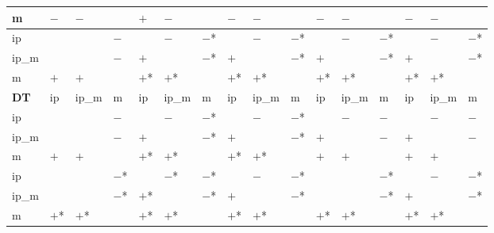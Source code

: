 \begin{table}[htbp]
{\begin{tabular}{l|lll|lll|lll|lll|lll}
m            & $-$        & $-$        &            & $+$        & $-$        &            & $-$        & $-$        &            & $-$        & $-$        &            & $-$        & $-$        &             \\
\hline
\hline
ip           &            &            & $-$        &            & $-$        & $-$*       &            & $-$        & $-$*       &            & $-$        & $-$*       &            & $-$        & $-$*        \\
ip\_m        &            &            & $-$        & $+$        &            & $-$*       & $+$        &            & $-$*       & $+$        &            & $-$*       & $+$        &            & $-$*        \\
m            & $+$        & $+$        &            & $+$*       & $+$*       &            & $+$*       & $+$*       &            & $+$*       & $+$*       &            & $+$*       & $+$*       &             \\
\hline
\textbf{DT}  & ip         & ip\_m      & m          & ip         & ip\_m      & m          & ip         & ip\_m      & m          & ip         & ip\_m      & m          & ip         & ip\_m      & m           \\
\hline
ip           &            &            & $-$        &            & $-$        & $-$*       &            & $-$        & $-$*       &            & $-$        & $-$        &            & $-$        & $-$         \\
ip\_m        &            &            & $-$        & $+$        &            & $-$*       & $+$        &            & $-$*       & $+$        &            & $-$        & $+$        &            & $-$         \\
m            & $+$        & $+$        &            & $+$*       & $+$*       &            & $+$*       & $+$*       &            & $+$        & $+$        &            & $+$        & $+$        &             \\
\hline
\hline
ip           &            &            & $-$*       &            & $-$*       & $-$*       &            & $-$        & $-$*       &            &            & $-$*       &            & $-$        & $-$*        \\
ip\_m        &            &            & $-$*       & $+$*       &            & $-$*       & $+$        &            & $-$*       &            &            & $-$*       & $+$        &            & $-$*        \\
m            & $+$*       & $+$*       &            & $+$*       & $+$*       &            & $+$*       & $+$*       &            & $+$*       & $+$*       &            & $+$*       & $+$*       &             \\

\end{tabular}}
\end{table}
